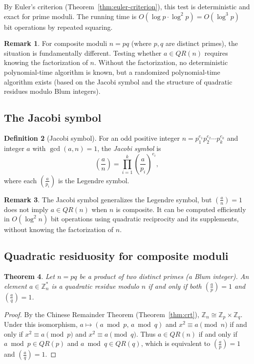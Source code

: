 \documentclass[twoside,12pt]{book}
\theoremstyle{plain}
\newtheorem{theorem}{Theorem}[chapter]
\theoremstyle{definition}
\newtheorem{definition}[theorem]{Definition}
\newtheorem{remark}[theorem]{Remark}
\theoremstyle{remark}
\begin{document}
By Euler's criterion (Theorem~\ref{thm:euler-criterion}), this test is deterministic and exact for prime moduli. The running time is $O(\log p \cdot \log^2 p) = O(\log^3 p)$ bit operations by repeated squaring.

\begin{remark}
For composite moduli $n = pq$ (where $p, q$ are distinct primes), the situation is fundamentally different. Testing whether $a \in QR(n)$ requires knowing the factorization of $n$. Without the factorization, no deterministic polynomial-time algorithm is known, but a randomized polynomial-time algorithm exists (based on the Jacobi symbol and the structure of quadratic residues modulo Blum integers).
\end{remark}

\subsection{The Jacobi symbol}

\begin{definition}[Jacobi symbol]
For an odd positive integer $n = p_1^{e_1} p_2^{e_2} \cdots p_k^{e_k}$ and integer $a$ with $\gcd(a, n) = 1$, the \emph{Jacobi symbol} is
\[
\left(\frac{a}{n}\right) = \prod_{i=1}^{k} \left(\frac{a}{p_i}\right)^{e_i},
\]
where each $\left(\frac{a}{p_i}\right)$ is the Legendre symbol.
\end{definition}

\begin{remark}
The Jacobi symbol generalizes the Legendre symbol, but $\left(\frac{a}{n}\right) = 1$ does not imply $a \in QR(n)$ when $n$ is composite. It can be computed efficiently in $O(\log^2 n)$ bit operations using quadratic reciprocity and its supplements, without knowing the factorization of $n$.
\end{remark}

\subsection{Quadratic residuosity for composite moduli}

\begin{theorem}
\label{thm:qr-composite}
Let $n = pq$ be a product of two distinct primes (a \emph{Blum integer}). An element $a \in \mathbb{Z}_n^*$ is a quadratic residue modulo $n$ if and only if both $\left(\frac{a}{p}\right) = 1$ and $\left(\frac{a}{q}\right) = 1$.
\end{theorem}

\begin{proof}
By the Chinese Remainder Theorem (Theorem~\ref{thm:crt}), $\mathbb{Z}_n \cong \mathbb{Z}_p \times \mathbb{Z}_q$. Under this isomorphism, $a \mapsto (a \bmod p, \, a \bmod q)$ and $x^2 \equiv a \pmod{n}$ if and only if $x^2 \equiv a \pmod{p}$ and $x^2 \equiv a \pmod{q}$. Thus $a \in QR(n)$ if and only if $a \bmod p \in QR(p)$ and $a \bmod q \in QR(q)$, which is equivalent to $\left(\frac{a}{p}\right) = 1$ and $\left(\frac{a}{q}\right) = 1$.
\end{proof}
\end{document}
